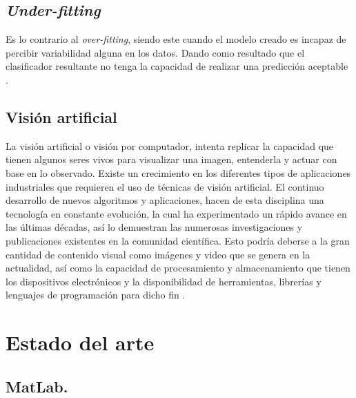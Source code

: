 \section{\textit{Under-fitting}}

Es lo contrario al \textit{over-fitting}, siendo este cuando el modelo creado es incapaz de percibir variabilidad alguna en los datos. Dando como resultado que el clasificador resultante no tenga la capacidad de realizar una predicción aceptable \cite{jabbar2015methods}.

\section{Visión artificial} La visión artificial o visión por computador, intenta replicar la capacidad que tienen algunos seres vivos para visualizar una imagen, entenderla y actuar con base en lo observado. Existe un crecimiento en los diferentes tipos de aplicaciones industriales que requieren el uso de técnicas de visión artificial. El  continuo  desarrollo  de  nuevos  algoritmos  y  aplicaciones,  hacen  de  esta  disciplina  una tecnología en constante evolución, la cual ha experimentado un rápido avance en las últimas décadas, así lo demuestran las numerosas investigaciones y publicaciones existentes en la comunidad científica.  Esto podría deberse a la gran cantidad de contenido visual como imágenes y video que se genera en  la  actualidad,  así  como  la  capacidad  de  procesamiento  y  almacenamiento  que  tienen  los dispositivos electrónicos y la disponibilidad de herramientas, librerías y lenguajes de programación para dicho fin \cite{ref_15}.






\chapter{Estado del arte}

\section{MatLab.}

